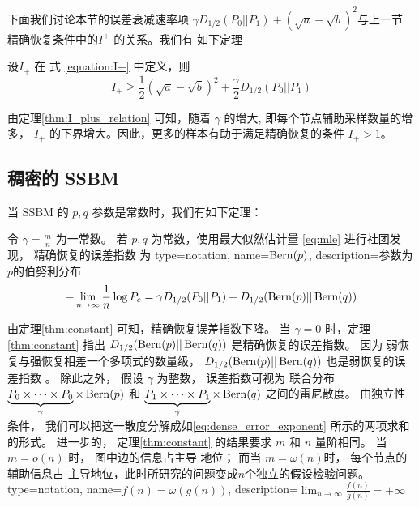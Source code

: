下面我们讨论本节的误差衰减速率项
$\gamma D_{1/2}(P_0||P_1) +
(\sqrt{a} - \sqrt{b})^2$与上一节
精确恢复条件中的$I^+$ 的关系。我们有
如下定理
\begin{theorem}\label{thm:I_plus_relation}
    设$I_+$ 在 式 \eqref{equation:I+}
    中定义，则
    \begin{equation}
        I_+ \geq \frac{1}{2}
        (\sqrt{a} - \sqrt{b})^2 +
        \frac{\gamma}{2} D_{1/2}(P_0||P_1)
    \end{equation}
\end{theorem}
	由定理\ref{thm:I_plus_relation}
    可知，随着  $\gamma$ 的增大, 即每个节点辅助采样数量的增多， $I_+$
    的下界增大。因此，更多的样本有助于满足精确恢复的条件 $I_+>1$。 

\subsection{稠密的 SSBM}
当 SSBM 的 $p,q$ 参数是常数时，我们有如下定理：
\begin{theorem}\label{thm:constant}
	令 $\gamma = \frac{m}{n}$ 为一常数。
    若 $p,q$ 为常数，使用最大似然估计量 \eqref{eq:mle}
    进行社团发现，
	精确恢复的误差指数
    为
{
  type=notation,
  name={$\operatorname{Bern}(p)$},
  description={参数为$p$的伯努利分布}
}
	\begin{equation}\label{eq:dense_error_exponent}
	-\lim_{n\to \infty} \frac{1}{n}\log P_e = 
     \gamma D_{1/2}(P_0 || P_1) + D_{1/2}(\operatorname{Bern}(p)||\operatorname{Bern}(q))
	\end{equation} 
\end{theorem}

由定理\ref{thm:constant} 可知，精确恢复误差指数下降。
当 $\gamma=0$ 时，定理\ref{thm:constant} 指出
$D_{1/2}(\operatorname{Bern}(p)||\operatorname{Bern}(q))$
是精确恢复的误差指数。
因为
弱恢复与强恢复相差一个多项式的数量级，
$D_{1/2}(\operatorname{Bern}(p)||\operatorname{Bern}(q))$ 也是弱恢复的误差指数
\cite{zhang2016}。
除此之外， 假设 $\gamma$ 为整数，
误差指数可视为 
联合分布
$\underbrace{P_0\times \dots \times P_0}_{\gamma} \times \Bern(p)$
和 $\underbrace{P_1\times \dots \times P_1}_{\gamma} \times \Bern(q)$
之间的雷尼散度。
由独立性条件，
我们可以把这一散度分解成如\eqref{eq:dense_error_exponent}
所示的两项求和的形式。
进一步的， 定理\ref{thm:constant}
的结果要求
$m$ 和 $n$ 量阶相同。
当 $m=o(n)$ 时，
图中边的信息占主导
地位；
而当 $m=\omega(n)$时，
每个节点的辅助信息占
主导地位，此时所研究的问题变成$n$个独立的假设检验问题。
{
  type=notation,
  name={$f(n)=\omega(g(n))$},
  description={$\lim_{n\to \infty} \frac{f(n)}{g(n)} = +\infty$}
}


